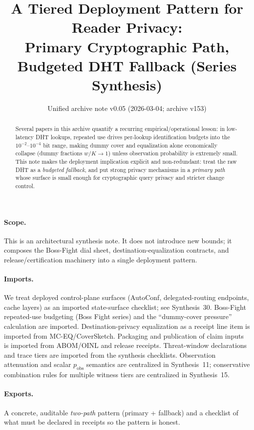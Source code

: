 \documentclass[11pt]{article}
\title{A Tiered Deployment Pattern for Reader Privacy:\\ Primary Cryptographic Path, Budgeted DHT Fallback (Series Synthesis)}
\author{}
\date{Unified archive note v0.05 (2026-03-04; archive v153)}
\begin{document}
\maketitle

\begin{abstract}
Several papers in this archive quantify a recurring empirical/operational lesson:
in low-latency DHT lookups, repeated use drives per-lookup identification budgets into the $10^{-2}$--$10^{-4}$ bit range, making dummy cover and equalization alone economically collapse (dummy fractions $w/K\to 1$) unless observation probability is extremely small.
This note makes the deployment implication explicit and non-redundant: treat the raw DHT as a \emph{budgeted fallback}, and put strong privacy mechanisms in a \emph{primary path} whose surface is small enough for cryptographic query privacy and stricter change control.
\end{abstract}

\paragraph{Scope.}
This is an architectural synthesis note. It does not introduce new bounds; it composes the Boss-Fight dial sheet, destination-equalization contracts, and release/certification machinery into a single deployment pattern.

\paragraph{Imports.}
We treat deployed control-plane surfaces (AutoConf, delegated-routing endpoints, cache layers) as an imported state-surface checklist; see Synthesis~30.\cite{series:deployedsurfaces}
Boss-Fight repeated-use budgeting (Boss Fight series) and the ``dummy-cover pressure'' calculation are imported.\cite{series:bossfightB}
Destination-privacy equalization as a receipt line item is imported from MC-EQ/CoverSketch.\cite{series:mceq}
Packaging and publication of claim inputs is imported from ABOM/OINL and release receipts.\cite{series:abomoinl,series:release}
Threat-window declarations and trace tiers are imported from the synthesis checklists.\cite{series:threatwindows,series:traceifaces}
Observation attenuation and scalar $p_{\mathrm{obs}}$ semantics are centralized in Synthesis~11; conservative combination rules for multiple witness tiers are centralized in Synthesis~15.\cite{series:obsatten,series:tieredobs}

\paragraph{Exports.}
A concrete, auditable \emph{two-path} pattern (primary + fallback) and a checklist of what must be declared in receipts so the pattern is honest.
\end{document}
